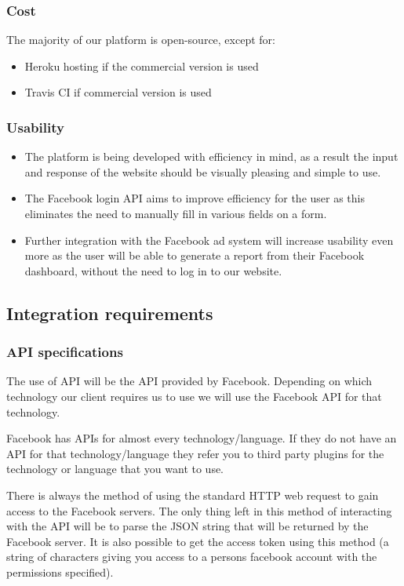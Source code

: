 \documentclass{article}
\begin{document}
		\subsubsection{Cost}
			The majority of our platform is open-source, except for:
		\begin{itemize}
			\item Heroku hosting if the commercial version is used
			\item Travis CI if commercial version is used
		\end{itemize}

		\subsubsection{Usability}
		\begin{itemize}
			\item The platform is being developed with efficiency in mind, as a result the input and response of the website should be visually pleasing and simple to use.
			\item The Facebook login API aims to improve efficiency for the user as this eliminates the need to manually fill in various fields on a form.
			\item Further integration with the Facebook ad system will increase usability even more as the user will be able to generate a report from their Facebook dashboard, without the need to log in to our website.
		\end{itemize}
		 



	\subsection{Integration requirements}
		\subsubsection{API specifications}
			The use of API will be the API provided by Facebook. Depending on which technology our client requires us to use we will use the Facebook API for that technology.

			Facebook has APIs for almost every technology/language. If they do not have an API for that technology/language they refer you to third party plugins for the technology or language that you want to use.

			There is always the method of using the standard HTTP web request to gain access to the Facebook servers. The only thing left in this method of interacting with the API will be to parse the JSON string that will be returned by the Facebook server. It is also possible to get the access token using this method (a string of characters giving you access to a persons facebook account with the permissions specified).
\end{document}
